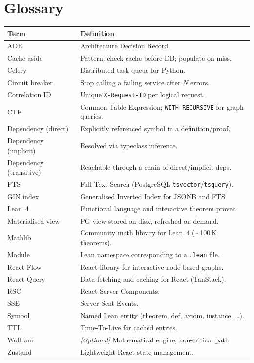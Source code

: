 \chapter{Glossary}

\begin{longtable}{@{}lp{10cm}@{}}
\toprule
\textbf{Term} & \textbf{Definition} \\
\midrule
\endhead
ADR           & Architecture Decision Record. \\
Cache-aside   & Pattern: check cache before DB; populate on miss. \\
Celery        & Distributed task queue for Python. \\
Circuit breaker & Stop calling a failing service after $N$ errors. \\
Correlation ID & Unique \texttt{X-Request-ID} per logical request. \\
CTE           & Common Table Expression; \texttt{WITH RECURSIVE} for graph queries. \\
Dependency (direct) & Explicitly referenced symbol in a definition/proof. \\
Dependency (implicit) & Resolved via typeclass inference. \\
Dependency (transitive) & Reachable through a chain of direct/implicit deps. \\
FTS           & Full-Text Search (PostgreSQL \texttt{tsvector}/\texttt{tsquery}). \\
GIN index     & Generalised Inverted Index for JSONB and FTS. \\
Lean~4        & Functional language and interactive theorem prover. \\
Materialised view & PG view stored on disk, refreshed on demand. \\
Mathlib       & Community math library for Lean~4 ($\sim$100\,K theorems). \\
Module        & Lean namespace corresponding to a \texttt{.lean} file. \\
React Flow    & React library for interactive node-based graphs. \\
React Query   & Data-fetching and caching for React (TanStack). \\
RSC           & React Server Components. \\
SSE           & Server-Sent Events. \\
Symbol        & Named Lean entity (theorem, def, axiom, instance, \ldots). \\
TTL           & Time-To-Live for cached entries. \\
Wolfram       & \emph{[Optional]} Mathematical engine; non-critical path. \\
Zustand       & Lightweight React state management. \\
\bottomrule
\end{longtable}

